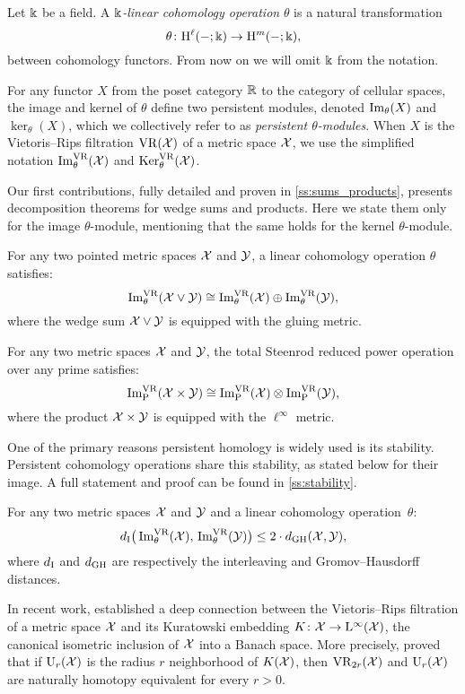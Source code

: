 Let \(\Bbbk\) be a field.
A \textit{\(\Bbbk\)-linear cohomology operation} \(\theta\) is a natural transformation
\[
\theta \colon \mathrm{H}^\ell(-;\Bbbk) \to \mathrm{H}^m(-;\Bbbk),
\]
between cohomology functors.
From now on we will omit \(\Bbbk\) from the notation.

For any functor \(X\) from the poset category $\mathbb{R}$ to the category of cellular spaces, the image and kernel of \(\theta\) define two persistent modules, denoted \(\operatorname{Im}_\theta(X)\) and \(\ker_\theta(X)\), which we collectively refer to as \textit{persistent \(\theta\)-modules}.
When \(X\) is the Vietoris--Rips filtration \(\mathrm{VR}(\mathcal{X})\) of a metric space \(\mathcal{X}\), we use the simplified notation \(\operatorname{Im}_\theta^{\mathrm{VR}}(\mathcal{X})\) and \(\operatorname{Ker}_\theta^{\mathrm{VR}}(\mathcal{X})\).

Our first contributions, fully detailed and proven in \cref{ss:sums_products}, presents decomposition theorems for wedge sums and products.
Here we state them only for the image $\theta$-module, mentioning that the same holds for the kernel $\theta$-module.

\medskip\theorem For any two pointed metric spaces $\mathcal{X}$ and $\mathcal{Y}$, a linear cohomology operation \(\theta\) satisfies:
\[
\operatorname{Im}_\theta^{\mathrm{VR}}(\mathcal{X} \vee \mathcal{Y}) \cong \operatorname{Im}_\theta^{\mathrm{VR}}(\mathcal{X}) \oplus \operatorname{Im}_\theta^{\mathrm{VR}}(\mathcal{Y}),
\]
where the wedge sum \(\mathcal{X} \vee \mathcal{Y}\) is equipped with the gluing metric.

\medskip\theorem
For any two metric spaces $\mathcal{X}$ and $\mathcal{Y}$, the total Steenrod reduced power operation over any prime satisfies:
\[
\operatorname{Im}^{\mathrm{VR}}_{\mathrm{P}}(\mathcal{X} \times \mathcal{Y}) \cong \operatorname{Im}^{\mathrm{VR}}_{\mathrm{P}}(\mathcal{X}) \otimes \operatorname{Im}^{\mathrm{VR}}_{\mathrm{P}}(\mathcal{Y}),
\]
where the product \(\mathcal{X} \times \mathcal{Y}\) is equipped with the \(\ell^\infty\) metric.

\medskip One of the primary reasons persistent homology is widely used is its stability.
Persistent cohomology operations share this stability, as stated below for their image.
A full statement and proof can be found in \cref{ss:stability}.

\medskip\theorem For any two metric spaces $\mathcal{X}$ and $\mathcal{Y}$ and a linear cohomology operation~$\theta$:
\[
d_{\mathrm{I}}\big(\operatorname{Im}_\theta^{\mathrm{VR}}(\mathcal{X}),\, \operatorname{Im}_\theta^{\mathrm{VR}}(\mathcal{Y})\big) \leq 2 \cdot d_{\mathrm{GH}}(\mathcal{X},\mathcal{Y}),
\]
where \(d_{\mathrm{I}}\) and \(d_{\mathrm{GH}}\) are respectively the interleaving and Gromov--Hausdorff distances.

\medskip In recent work, \cite{lim2024vietoris} established a deep connection between the Vietoris--Rips filtration of a metric space \(\mathcal{X}\) and its Kuratowski embedding \(K \colon \mathcal{X} \to \mathrm{L}^\infty(\mathcal{X})\), the canonical isometric inclusion of \(\mathcal{X}\) into a Banach space.
More precisely, \cite{lim2024vietoris} proved that if \(\mathrm{U}_r(\mathcal{X})\) is the radius \(r\) neighborhood of \(K(\mathcal{X})\), then \(\mathrm{VR}_{2r}(\mathcal{X})\) and \(\mathrm{U}_r(\mathcal{X})\) are naturally homotopy equivalent for every \(r > 0\).


